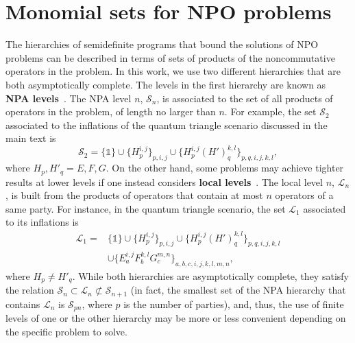 \documentclass[superscriptaddress,aps,prx,nofootinbib,twocolumn,twoside,reprint,letterpaper,longbibliography]{revtex4-2}
\newcommand{\term}[1]{\textcolor{medblue}{\textbf{#1}}}
\def\id{\boldsymbol{\mathbb{1}}}
\begin{document}
\section{Monomial sets for NPO problems}\label{app:sets}
The hierarchies of semidefinite programs that bound the solutions of NPO problems can be described in terms of sets of products of the noncommutative operators in the problem.
In this work, we use two different hierarchies that are both asymptotically complete.
The levels in the first hierarchy are known as \term{NPA levels}~\cite{npa,npa2}.
The NPA level $n$, $\mathcal{S}_n$, is associated to the set of all products of operators in the problem, of length no larger than $n$.
For example, the set $\mathcal{S}_2$ associated to the inflations of the quantum triangle scenario discussed in the main text is
\begin{equation*}
  \mathcal{S}_2=\{\id\}\cup\{H^{i,j}_p\}_{p,i,j}\cup\{H^{i,j}_p (H')^{k,l}_q\}_{p,q,i,j,k,l},
\end{equation*}
where $H_p,H'_q=E,F,G$.
On the other hand, some problems may achieve tighter results at lower levels if one instead considers \term{local levels}~\cite{LocalLevel}.
The local level $n$, $\mathcal{L}_n$, is built from the products of operators that contain at most $n$ operators of a same party.
For instance, in the quantum triangle scenario, the set $\mathcal{L}_1$ associated to its inflations is
\begin{align*}
  \mathcal{L}_1=&\{\id\}\cup\{H^{i,j}_p\}_{p,i,j}\cup\{H^{i,j}_p (H')^{k,l}_q\}_{p,q,i,j,k,l}\\
  &\cup\{E^{i,j}_a F^{k,l}_b G^{m,n}_c\}_{a,b,c,i,j,k,l,m,n},
\end{align*}
where $H_p\neq H'_q$.
While both hierarchies are asymptotically complete, they satisfy the relation $\mathcal{S}_n\subset\mathcal{L}_n\not\subset\mathcal{S}_{n+1}$ (in fact, the smallest set of the NPA hierarchy that contains $\mathcal{L}_n$ is $\mathcal{S}_{pn}$, where $p$ is the number of parties), and, thus, the use of finite levels of one or the other hierarchy may be more or less convenient depending on the specific problem to solve.
\end{document}
